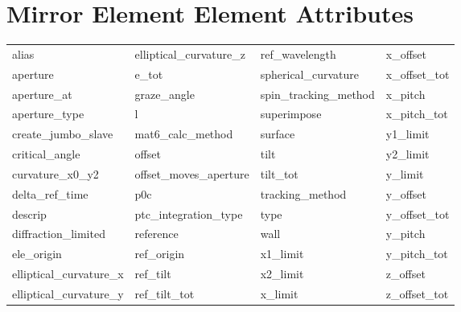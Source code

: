  \section{Mirror Element Element Attributes}
 \label{s:list.mirror}
 
 \begin{tabular}{llll} \toprule
alias                       & elliptical_curvature_z      & ref_wavelength              & x_offset                    \\
aperture                    & e_tot                       & spherical_curvature         & x_offset_tot                \\
aperture_at                 & graze_angle                 & spin_tracking_method        & x_pitch                     \\
aperture_type               & l                           & superimpose                 & x_pitch_tot                 \\
create_jumbo_slave          & mat6_calc_method            & surface                     & y1_limit                    \\
critical_angle              & offset                      & tilt                        & y2_limit                    \\
curvature_x0_y2             & offset_moves_aperture       & tilt_tot                    & y_limit                     \\
delta_ref_time              & p0c                         & tracking_method             & y_offset                    \\
descrip                     & ptc_integration_type        & type                        & y_offset_tot                \\
diffraction_limited         & reference                   & wall                        & y_pitch                     \\
ele_origin                  & ref_origin                  & x1_limit                    & y_pitch_tot                 \\
elliptical_curvature_x      & ref_tilt                    & x2_limit                    & z_offset                    \\
elliptical_curvature_y      & ref_tilt_tot                & x_limit                     & z_offset_tot                \\
 \bottomrule
 \end{tabular}
 \vfill
 
